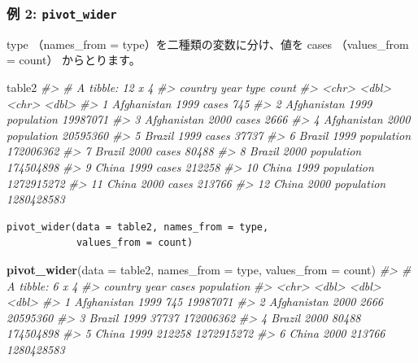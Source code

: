 \documentclass[
  xelatex, ja=standard]{bxjsbook}
\newenvironment{Shaded}{\begin{snugshade}}{\end{snugshade}}
\newcommand{\AttributeTok}[1]{\textcolor[rgb]{0.13,0.29,0.53}{#1}}
\newcommand{\CommentTok}[1]{\textcolor[rgb]{0.56,0.35,0.01}{\textit{#1}}}
\newcommand{\FunctionTok}[1]{\textcolor[rgb]{0.13,0.29,0.53}{\textbf{#1}}}
\newcommand{\NormalTok}[1]{#1}
\theoremstyle{definition}
\theoremstyle{definition}
\theoremstyle{definition}
\theoremstyle{definition}
\theoremstyle{remark}
\begin{document}
\hypertarget{ux4f8b-2-pivot_wider}{%
\subsubsection{\texorpdfstring{例 2: \texttt{pivot\_wider}}{例 2: pivot\_wider}}\label{ux4f8b-2-pivot_wider}}

type （names\_from = type）を二種類の変数に分け、値を cases （values\_from = count） からとります。

\begin{Shaded}
\begin{Highlighting}[]
\NormalTok{table2}
\CommentTok{\#\textgreater{} \# A tibble: 12 x 4}
\CommentTok{\#\textgreater{}    country      year type            count}
\CommentTok{\#\textgreater{}    \textless{}chr\textgreater{}       \textless{}dbl\textgreater{} \textless{}chr\textgreater{}           \textless{}dbl\textgreater{}}
\CommentTok{\#\textgreater{}  1 Afghanistan  1999 cases             745}
\CommentTok{\#\textgreater{}  2 Afghanistan  1999 population   19987071}
\CommentTok{\#\textgreater{}  3 Afghanistan  2000 cases            2666}
\CommentTok{\#\textgreater{}  4 Afghanistan  2000 population   20595360}
\CommentTok{\#\textgreater{}  5 Brazil       1999 cases           37737}
\CommentTok{\#\textgreater{}  6 Brazil       1999 population  172006362}
\CommentTok{\#\textgreater{}  7 Brazil       2000 cases           80488}
\CommentTok{\#\textgreater{}  8 Brazil       2000 population  174504898}
\CommentTok{\#\textgreater{}  9 China        1999 cases          212258}
\CommentTok{\#\textgreater{} 10 China        1999 population 1272915272}
\CommentTok{\#\textgreater{} 11 China        2000 cases          213766}
\CommentTok{\#\textgreater{} 12 China        2000 population 1280428583}
\end{Highlighting}
\end{Shaded}

\begin{verbatim}
pivot_wider(data = table2, names_from = type, 
            values_from = count)
\end{verbatim}

\begin{Shaded}
\begin{Highlighting}[]
\FunctionTok{pivot\_wider}\NormalTok{(}\AttributeTok{data =}\NormalTok{ table2, }\AttributeTok{names\_from =}\NormalTok{ type, }
            \AttributeTok{values\_from =}\NormalTok{ count)}
\CommentTok{\#\textgreater{} \# A tibble: 6 x 4}
\CommentTok{\#\textgreater{}   country      year  cases population}
\CommentTok{\#\textgreater{}   \textless{}chr\textgreater{}       \textless{}dbl\textgreater{}  \textless{}dbl\textgreater{}      \textless{}dbl\textgreater{}}
\CommentTok{\#\textgreater{} 1 Afghanistan  1999    745   19987071}
\CommentTok{\#\textgreater{} 2 Afghanistan  2000   2666   20595360}
\CommentTok{\#\textgreater{} 3 Brazil       1999  37737  172006362}
\CommentTok{\#\textgreater{} 4 Brazil       2000  80488  174504898}
\CommentTok{\#\textgreater{} 5 China        1999 212258 1272915272}
\CommentTok{\#\textgreater{} 6 China        2000 213766 1280428583}
\end{Highlighting}
\end{Shaded}
\end{document}
